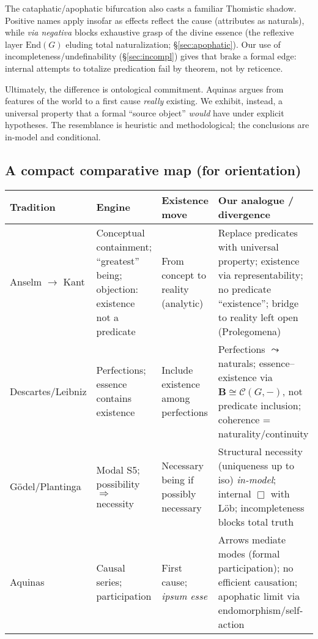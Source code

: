 \documentclass[11pt]{article}
\theoremstyle{upright}
\begin{document}
The cataphatic/apophatic bifurcation also casts a familiar Thomistic shadow. Positive names apply insofar as effects reflect the cause (attributes as naturals), while \emph{via negativa} \citep{Aquinas1920} blocks exhaustive grasp of the divine essence (the reflexive layer \(\mathrm{End}(G)\) eluding total naturalization; \S\ref{sec:apophatic}). Our use of incompleteness/undefinability (\S\ref{sec:incompl}) gives that brake a formal edge: internal attempts to totalize predication fail by theorem, not by reticence.

Ultimately, the difference is ontological commitment. Aquinas argues from features of the world to a first cause \emph{really} existing. We exhibit, instead, a universal property that a formal “source object” \emph{would} have under explicit hypotheses. The resemblance is heuristic and methodological; the conclusions are in-model and conditional.

\subsection*{A compact comparative map (for orientation)}
\begin{center}
\begin{tabular}{p{3.1cm}p{3.7cm}p{3.7cm}p{4.2cm}}
\hline
\textbf{Tradition} & \textbf{Engine} & \textbf{Existence move} & \textbf{Our analogue / divergence}\\
\hline
Anselm $\to$ Kant & Conceptual containment; “greatest” being; objection: existence not a predicate & From concept to reality (analytic) & Replace predicates with universal property; existence via representability; no predicate “existence”; bridge to reality left open (Prolegomena)\\[0.2em]
Descartes/Leibniz & Perfections; essence contains existence & Include existence among perfections & Perfections $\leadsto$ naturals; essence–existence via \(\mathbf B\cong\mathcal C(G,-)\), not predicate inclusion; coherence = naturality/continuity\\[0.2em]
Gödel/Plantinga & Modal S5; possibility $\Rightarrow$ necessity & Necessary being if possibly necessary & Structural necessity (uniqueness up to iso) \emph{in-model}; internal \(\Box\) with Löb; incompleteness blocks total truth\\[0.2em]
Aquinas & Causal series; participation & First cause; \emph{ipsum esse} & Arrows mediate modes (formal participation); no efficient causation; apophatic limit via endomorphism/self-action\\
\hline
\end{tabular}
\end{center}
\end{document}
